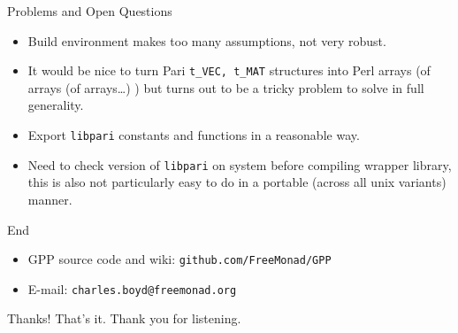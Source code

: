 \documentclass{beamer}
\begin{document}
\begin{frame}{Problems and Open Questions}
\begin{itemize}
	\item Build environment makes too many assumptions, not very robust.
	\item It would be nice to turn Pari \texttt{t\_VEC, t\_MAT} structures into Perl arrays (of arrays (of arrays\dots) ) but turns out to be a tricky problem to solve in full generality.
    \item Export \texttt{libpari} constants and functions in a reasonable way.
    \item Need to check version of \texttt{libpari} on system before compiling wrapper library, this is also not particularly easy to do in a portable (across all unix variants) manner.
\end{itemize}
\end{frame}

\begin{frame}{End}

\begin{itemize}
	\item GPP source code and wiki: \texttt{github.com/FreeMonad/GPP}
	\item E-mail: \texttt{charles.boyd@freemonad.org}
\end{itemize}

\begin{block}{Thanks!}
That's it. Thank you for listening.
\end{block}

\end{frame}
\end{document}
